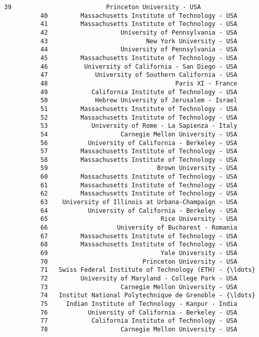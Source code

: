 \documentclass[11pt]{article}
\begin{document}
\begin{Verbatim}[commandchars=\\\{\}]
          39                          Princeton University - USA   
          40         Massachusetts Institute of Technology - USA   
          41         Massachusetts Institute of Technology - USA   
          42                    University of Pennsylvania - USA   
          43                           New York University - USA   
          44                    University of Pennsylvania - USA   
          45         Massachusetts Institute of Technology - USA   
          46          University of California - San Diego - USA   
          47             University of Southern California - USA   
          48                                   Paris XI - France   
          49            California Institute of Technology - USA   
          50             Hebrew University of Jerusalem - Israel   
          51         Massachusetts Institute of Technology - USA   
          52         Massachusetts Institute of Technology - USA   
          53            University of Rome - La Sapienza - Italy   
          54                    Carnegie Mellon University - USA   
          56           University of California - Berkeley - USA   
          57         Massachusetts Institute of Technology - USA   
          58         Massachusetts Institute of Technology - USA   
          59                              Brown University - USA   
          60         Massachusetts Institute of Technology - USA   
          61         Massachusetts Institute of Technology - USA   
          62         Massachusetts Institute of Technology - USA   
          63    University of Illinois at Urbana-Champaign - USA   
          64           University of California - Berkeley - USA   
          65                               Rice University - USA   
          66                   University of Bucharest - Romania   
          67         Massachusetts Institute of Technology - USA   
          68         Massachusetts Institute of Technology - USA   
          69                               Yale University - USA   
          70                          Princeton University - USA   
          71   Swiss Federal Institute of Technology (ETH) - {\ldots}   
          72         University of Maryland - College Park - USA   
          73                    Carnegie Mellon University - USA   
          74   Institut National Polytechnique de Grenoble - {\ldots}   
          75     Indian Institute of Technology - Kanpur - India   
          76           University of California - Berkeley - USA   
          77            California Institute of Technology - USA   
          78                    Carnegie Mellon University - USA   

\end{Verbatim}
\end{document}
